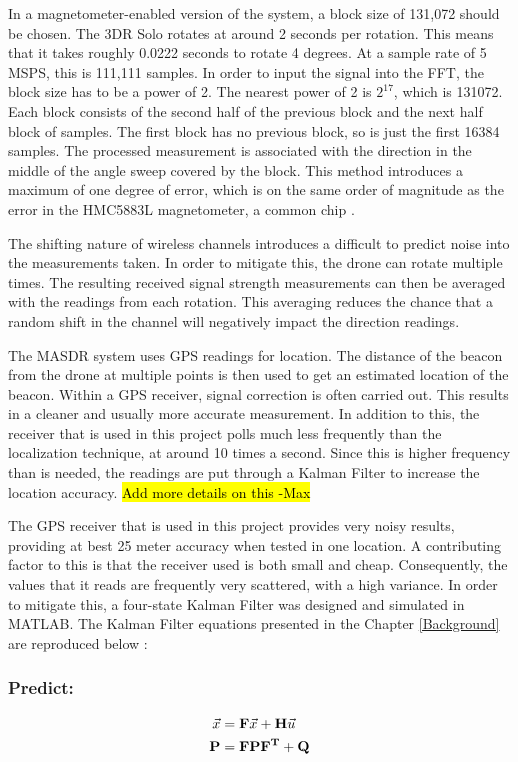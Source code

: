 In a magnetometer-enabled version of the system, a block size of 131,072 should be chosen. The 3DR Solo rotates at around 2 seconds per rotation. This means that it takes roughly 0.0222 seconds to rotate 4 degrees. At a sample rate of 5 MSPS, this is 111,111 samples. In order to input the signal into the FFT, the block size has to be a power of 2. The nearest power of 2 is $2^{17}$, which is 131072. Each block consists of the second half of the previous block and the next half block of samples. The first block has no previous block, so is just the first 16384 samples. The processed measurement is associated with the direction in the middle of the angle sweep covered by the block. This method introduces a maximum of one degree of error, which is on the same order of magnitude as the error in the HMC5883L magnetometer, a common chip \cite{magnetometer_data}. \par 
The shifting nature of wireless channels introduces a difficult to predict noise into the measurements taken. In order to mitigate this, the drone can rotate multiple times. The resulting received signal strength measurements can then be averaged with the readings from each rotation. This averaging reduces the chance that a random shift in the channel will negatively impact the direction readings. \par 
The MASDR system uses GPS readings for location. The distance of the beacon from the drone at multiple points is then used to get an estimated location of the beacon. Within a GPS receiver, signal correction is often carried out. This results in a cleaner and usually more accurate measurement. In addition to this, the receiver that is used in this project polls much less frequently than the localization technique, at around 10 times a second. Since this is higher frequency than is needed, the readings are put through a Kalman Filter to increase the location accuracy. \hl{Add more details on this -Max}\par 
The GPS receiver that is used in this project provides very noisy results, providing at best 25 meter accuracy when tested in one location. A contributing factor to this is that the receiver used is both small and cheap. Consequently, the values that it reads are frequently very scattered, with a high variance. In order to mitigate this, a four-state Kalman Filter was designed and simulated in MATLAB. The Kalman Filter equations presented in the Chapter \ref{Background} are reproduced below \cite{kf_book}: \par
\subsubsection*{Predict:}
\begin{align}
    \vec{x} &= \mathbf{F}\vec{x} + \mathbf{H}\vec{u} \label{eq:state_predict}\\ 
    \mathbf{P} &= \mathbf{F}\mathbf{P}\mathbf{F^T} + \mathbf{Q} \label{eq:var_predict}
\end{align}
